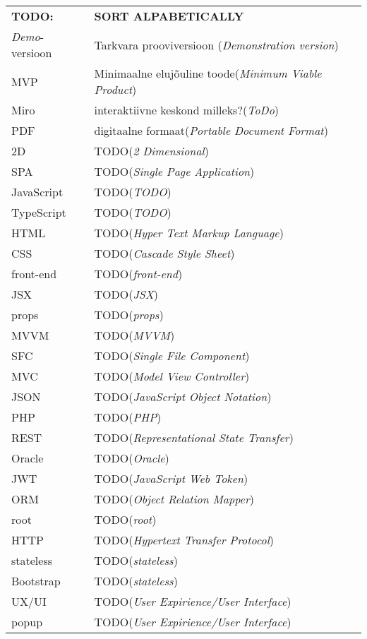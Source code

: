 \begin{longtable}{p{3cm}p{10cm}}
\textbf{TODO:}&\textbf{SORT ALPABETICALLY}\\
\textit{Demo}-versioon&Tarkvara prooviversioon (\emph{Demonstration version})\\
MVP&Minimaalne elujõuline toode(\emph{Minimum Viable Product})\\
Miro&interaktiivne keskond milleks?(\emph{ToDo})\\
PDF&digitaalne formaat(\emph{Portable Document Format})\\
2D&TODO(\emph{2 Dimensional})\\
SPA&TODO(\emph{Single Page Application})\\
JavaScript&TODO(\emph{TODO})\\
TypeScript&TODO(\emph{TODO})\\
HTML&TODO(\emph{Hyper Text Markup Language})\\
CSS&TODO(\emph{Cascade Style Sheet})\\
front-end&TODO(\emph{front-end})\\
JSX&TODO(\emph{JSX})\\
props&TODO(\emph{props})\\
MVVM&TODO(\emph{MVVM})\\
SFC&TODO(\emph{Single File Component})\\
MVC&TODO(\emph{Model View Controller})\\
JSON&TODO(\emph{JavaScript Object Notation})\\
PHP&TODO(\emph{PHP})\\
REST&TODO(\emph{Representational State Transfer})\\
Oracle&TODO(\emph{Oracle})\\
JWT&TODO(\emph{JavaScript Web Token})\\
ORM&TODO(\emph{Object Relation Mapper})\\
root&TODO(\emph{root})\\
HTTP&TODO(\emph{Hypertext Transfer Protocol})\\
stateless&TODO(\emph{stateless})\\
Bootstrap&TODO(\emph{stateless})\\
UX/UI&TODO(\emph{User Expirience/User Interface})\\
popup&TODO(\emph{User Expirience/User Interface})\\


\end{longtable}
\addtocounter{table}{-1} 